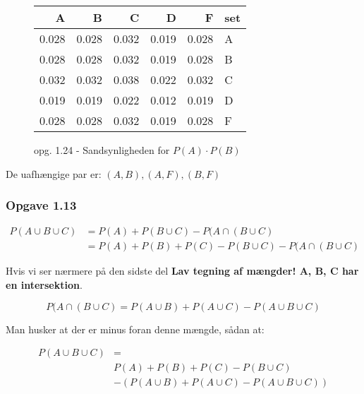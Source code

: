 \begin{figure}[ht]
    \centering
        \begin{tabular}{rrrrrl}
        \toprule
        A &      B &      C &      D &      F & set \\
        \midrule
        0.028 &  0.028 &  0.032 &  0.019 &  0.028 &   A \\
        0.028 &  0.028 &  0.032 &  0.019 &  0.028 &   B \\
        0.032 &  0.032 &  0.038 &  0.022 &  0.032 &   C \\
        0.019 &  0.019 &  0.022 &  0.012 &  0.019 &   D \\
        0.028 &  0.028 &  0.032 &  0.019 &  0.028 &   F \\
        \bottomrule
        \end{tabular}
    \caption{opg. 1.24 - Sandsynligheden for $P(A)\cdot P(B)$}
    \label{tab:1.24_3}
\end{figure}


De uafhængige par er: $(A,B), (A,F), (B,F)$

\subsubsection{Opgave 1.13}

\begin{align}
    P(A\cup B \cup C) &= P(A) + P(B\cup C) - P(A \cap (B \cup C) \\
    &= P(A) + P(B) + P(C) - P(B\cup C ) - P(A \cap (B \cup C) 
\end{align}

Hvis vi ser nærmere på den sidste del  \textbf{Lav tegning af mængder! A, B, C har en intersektion}.

\begin{equation}
    P(A \cap (B \cup C) = P(A \cup B) + P(A \cup C) - P(A \cup B \cup C)
\end{equation}

Man husker at der er minus foran denne mængde, sådan at:

\begin{align}
    P(A\cup B \cup C) &= \\ &P(A) + P(B) + P(C) - P(B\cup C ) \\ &- (P(A \cup B) + P(A \cup C) - P(A \cup B \cup C))
\end{align}